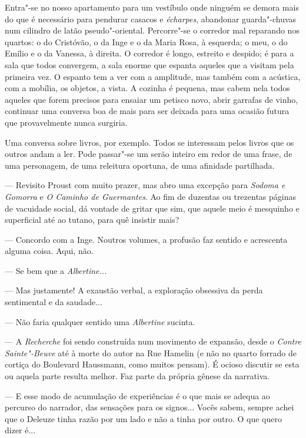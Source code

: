 Entra"-se no nosso apartamento para um vestíbulo onde ninguém se demora
mais do que é necessário para pendurar casacos e \emph{écharpes},
abandonar guarda"-chuvas num cilindro de latão pseudo"-oriental.
Percorre"-se o corredor mal reparando nos quartos: o do Cristóvão, o da
Inge e o da Maria Rosa, à esquerda; o meu, o do Emílio e o da Vanessa, à
direita. O corredor é longo, estreito e despido; é para a sala que todos
convergem, a sala enorme que espanta aqueles que a visitam pela primeira
vez. O espanto tem a ver com a amplitude, mas também com a acústica, com
a mobília, os objetos, a vista. A cozinha é pequena, mas cabem nela
todos aqueles que forem precisos para ensaiar um petisco novo, abrir
garrafas de vinho, continuar uma conversa boa de mais para ser deixada
para uma ocasião futura que provavelmente nunca surgiria.

Uma conversa sobre livros, por exemplo. Todos se interessam pelos
livros que os outros andam a ler. Pode passar"-se um serão inteiro em
redor de uma frase, de uma personagem, de uma releitura oportuna, de uma
afinidade partilhada.

--- Revisito Proust com muito prazer, mas abro uma excepção para
  \emph{Sodoma e Gomorra }e \emph{O Caminho de Guermantes}. Ao fim de
  duzentas ou trezentas páginas de vacuidade social, dá vontade de
  gritar que sim, que aquele meio é mesquinho e
superficial até ao tutano, para quê insistir mais?

--- Concordo com a Inge. Noutros volumes, a profusão faz sentido e
  acrescenta alguma coisa. Aqui, não.

--- Se bem que a \emph{Albertine...}

--- Mas justamente! A exaustão verbal, a exploração obsessiva da perda
  sentimental e da saudade...

--- Não faria qualquer sentido uma \emph{Albertine }sucinta.

--- A \emph{Recherche }foi sendo construída num movimento de expansão,
  desde o \emph{Contre Sainte"-Beuve }até à morte do autor na Rue Hamelin
  (e não no quarto forrado de cortiça do Boulevard Haussmann, como
  muitos pensam). É ocioso discutir se esta ou aquela parte resulta
  melhor. Faz parte da própria gênese da narrativa.

--- E esse modo de acumulação de experiências é o que mais se adequa ao
  percurso do narrador, das sensações para os signos... Vocês sabem,
  sempre achei que o Deleuze tinha razão por um lado e não a tinha por
  outro. O que quero dizer é...

